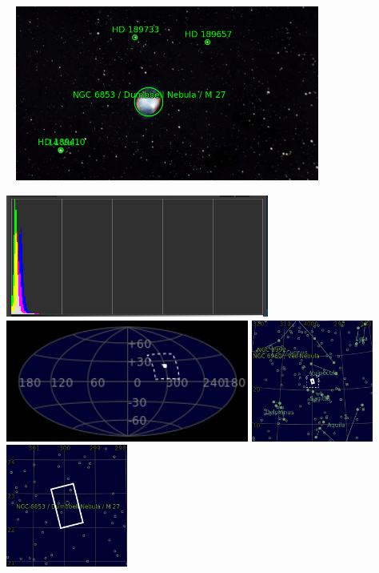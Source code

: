 \begin{center}
 \ \newpage
\includegraphics[width=0.75\textwidth]{../Imaging//Annotated/Dumbbell_Nebula_Annotated.jpg}

\includegraphics[height=4cm]{../Imaging//Annotated/Dumbbell_Nebula_Hist}
\includegraphics[height=4cm]{../Imaging//Annotated/Dumbbell_Nebula_Globe.jpg}
\includegraphics[height=4cm]{../Imaging//Annotated/Dumbbell_Nebula_Close.jpg}
\includegraphics[height=4cm]{../Imaging//Annotated/Dumbbell_Nebula_Closer.jpg}
\end{center}
